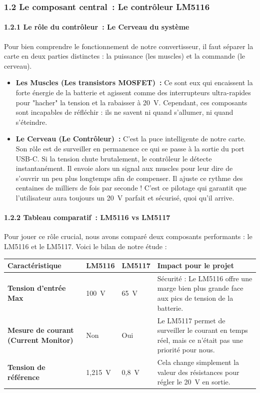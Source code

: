 \subsubsection*{1.2 Le composant central~: Le contrôleur LM5116}

\paragraph{1.2.1 Le rôle du contrôleur~: Le Cerveau du système}
Pour bien comprendre le fonctionnement de notre convertisseur, il faut séparer la carte en deux parties distinctes : la puissance (les muscles) et la commande (le cerveau).

\begin{itemize}
    \item \textbf{Les Muscles (Les transistors MOSFET)~:} Ce sont eux qui encaissent la forte énergie de la batterie et agissent comme des interrupteurs ultra-rapides pour "hacher" la tension et la rabaisser à 20~V. Cependant, ces composants sont incapables de réfléchir : ils ne savent ni quand s'allumer, ni quand s'éteindre.
    \item \textbf{Le Cerveau (Le Contrôleur)~:} C'est la puce intelligente de notre carte. Son rôle est de surveiller en permanence ce qui se passe à la sortie du port USB-C. Si la tension chute brutalement, le contrôleur le détecte instantanément. Il envoie alors un signal aux muscles pour leur dire de s'ouvrir un peu plus longtemps afin de compenser. Il ajuste ce rythme des centaines de milliers de fois par seconde ! C'est ce pilotage qui garantit que l'utilisateur aura toujours un 20~V parfait et sécurisé, quoi qu'il arrive.
\end{itemize}


\paragraph{1.2.2 Tableau comparatif~: LM5116 vs LM5117}
Pour jouer ce rôle crucial, nous avons comparé deux composants performants : le LM5116 et le LM5117. Voici le bilan de notre étude :

\begin{tableau}[htbp]
    \centering
    \begin{tabular}{|p{4cm}|p{2cm}|p{2cm}|p{6cm}|}
    \hline
    \textbf{Caractéristique} & \textbf{LM5116} & \textbf{LM5117} & \textbf{Impact pour le projet} \\
    \hline
    \textbf{Tension d'entrée Max} & 100~V & 65~V & Sécurité : Le LM5116 offre une marge bien plus grande face aux pics de tension de la batterie. \\
    \hline
    \textbf{Mesure de courant (Current Monitor)} & Non & Oui & Le LM5117 permet de surveiller le courant en temps réel, mais ce n'était pas une priorité pour nous. \\
    \hline
    \textbf{Tension de référence} & 1,215~V & 0,8~V & Cela change simplement la valeur des résistances pour régler le 20~V en sortie. \\
    \hline
    \end{tabular}
    \caption{Comparatif LM5116 et LM5117.}
\end{tableau}


